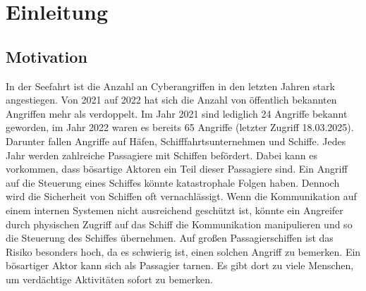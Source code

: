 \chapter{Einleitung}

\section{Motivation}
In der Seefahrt ist die Anzahl an Cyberangriffen in den letzten Jahren stark angestiegen. Von 2021 auf 2022 hat sich die Anzahl von öffentlich
bekannten Angriffen mehr als verdoppelt. Im Jahr 2021 sind lediglich 24 Angriffe bekannt geworden, im Jahr 2022 waren es bereits 65 Angriffe 
\cite{mcad} (letzter Zugriff 18.03.2025). Darunter fallen Angriffe auf Häfen, Schifffahrtsunternehmen und Schiffe.
Jedes Jahr werden zahlreiche Passagiere mit Schiffen befördert. Dabei kann es vorkommen, dass bösartige Aktoren ein Teil dieser Passagiere sind.
Ein Angriff auf die Steuerung eines Schiffes könnte katastrophale Folgen haben. Dennoch wird die Sicherheit von Schiffen oft vernachlässigt.
Wenn die Kommunikation auf einem internen Systemen nicht ausreichend geschützt ist, könnte ein Angreifer durch physischen Zugriff auf das Schiff die 
Kommunikation manipulieren und so die Steuerung des Schiffes übernehmen. Auf großen Passagierschiffen ist das Risiko besonders hoch, da es
schwierig ist, einen solchen Angriff zu bemerken. Ein bösartiger Aktor kann sich als Passagier tarnen. Es gibt dort
zu viele Menschen, um verdächtige Aktivitäten sofort zu bemerken. \\

